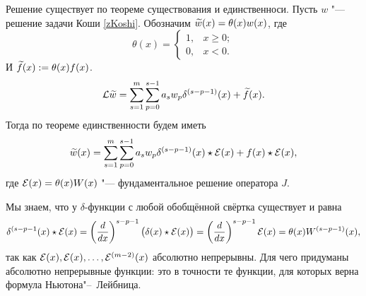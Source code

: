 \begin{Proof}
  Решение существует по теореме существования и единственноси. Пусть $w$ "--- решение задачи Коши \eqref{zKoshi}. Обозначим $\widetilde{w}{}(x) = \theta(x)w(x)$, где
\[
  \theta(x) = \begin{cases} 1,&x\ge0;\\0,&x<0.\end{cases}
\]
И $\widetilde{f}{}(x):=\theta(x)f(x)$. 
\[
  \mathcal L \widetilde{w}{} = \sum\limits_{s = 1}^{m}\sum\limits_{p = 0}^{s-1} a_s w_p\delta^{(s-p-1)}(x) + \widetilde{f}{}(x).
\]
Тогда по теореме единственности будем иметь \[\widetilde{w}{}(x)=\sum\limits_{s = 1}^{m}\sum\limits_{p = 0}^{s-1} a_sw_p\delta^{(s-p-1)}(x)\star\mathcal E(x)+f(x)\star\mathcal E(x),\] где $\mathcal E(x) = \theta(x) W(x)$ "--- фундаментальное решение оператора $J$.

Мы знаем, что у $\delta$-функции с любой обобщённой свёртка существует и равна
\[
  \delta^{(s-p-1}(x) \star \mathcal E(x) = \left(\frac{d}{dx}\right)^{s-p-1}\big(\delta(x)\star\mathcal E(x)\big) = \left(\frac{d}{dx}\right)^{s-p-1}\mathcal E(x) = \theta(x) W^{(s-p-1)}(x),\]
так как $\mathcal E(x),\mathcal E(x),\dots,\mathcal E^{(m-2)}(x)$ абсолютно непрерывны.
Для чего придуманы абсолютно непрерывные функции: это в точности те функции, для которых верна формула Ньютона"--~Лейбница.


\end{Proof}
